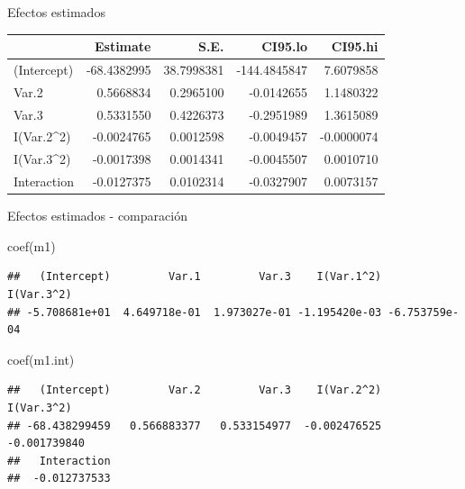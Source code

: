 \documentclass[
  11pt,
  ignorenonframetext,
]{beamer}
\newenvironment{Shaded}{}{}
\newcommand{\DecValTok}[1]{\textcolor[rgb]{0.25,0.63,0.44}{#1}}
\newcommand{\FunctionTok}[1]{\textcolor[rgb]{0.02,0.16,0.49}{#1}}
\newcommand{\NormalTok}[1]{#1}
\newcommand{\OtherTok}[1]{\textcolor[rgb]{0.00,0.44,0.13}{#1}}
\newcommand{\SpecialCharTok}[1]{\textcolor[rgb]{0.25,0.44,0.63}{#1}}
\begin{document}
\begin{frame}[fragile]{Efectos estimados}
\protect\hypertarget{efectos-estimados}{}
\begin{Shaded}
\end{Shaded}

\begin{longtable}[]{@{}lrrrr@{}}
\toprule()
& Estimate & S.E. & CI95.lo & CI95.hi \\
\midrule()
\endhead
(Intercept) & -68.4382995 & 38.7998381 & -144.4845847 & 7.6079858 \\
Var.2 & 0.5668834 & 0.2965100 & -0.0142655 & 1.1480322 \\
Var.3 & 0.5331550 & 0.4226373 & -0.2951989 & 1.3615089 \\
I(Var.2\^{}2) & -0.0024765 & 0.0012598 & -0.0049457 & -0.0000074 \\
I(Var.3\^{}2) & -0.0017398 & 0.0014341 & -0.0045507 & 0.0010710 \\
Interaction & -0.0127375 & 0.0102314 & -0.0327907 & 0.0073157 \\
\bottomrule()
\end{longtable}
\end{frame}

\begin{frame}[fragile]{Efectos estimados - comparación}
\protect\hypertarget{efectos-estimados---comparaciuxf3n}{}
\begin{Shaded}
\begin{Highlighting}[]
\FunctionTok{coef}\NormalTok{(m1)}
\end{Highlighting}
\end{Shaded}

\begin{verbatim}
##   (Intercept)         Var.1         Var.3    I(Var.1^2)    I(Var.3^2) 
## -5.708681e+01  4.649718e-01  1.973027e-01 -1.195420e-03 -6.753759e-04
\end{verbatim}

\begin{Shaded}
\begin{Highlighting}[]
\FunctionTok{coef}\NormalTok{(m1.int)}
\end{Highlighting}
\end{Shaded}

\begin{verbatim}
##   (Intercept)         Var.2         Var.3    I(Var.2^2)    I(Var.3^2) 
## -68.438299459   0.566883377   0.533154977  -0.002476525  -0.001739840 
##   Interaction 
##  -0.012737533
\end{verbatim}
\end{frame}
\end{document}
